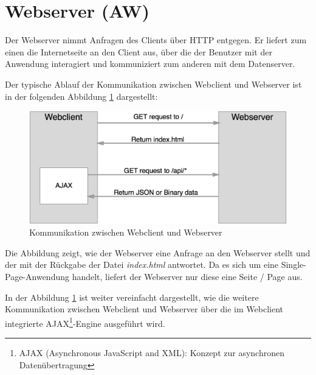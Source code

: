 \clearpage
\section{Webserver (AW)}
\label{section_webserver}
Der Webserver nimmt Anfragen des Clients über HTTP entgegen. Er liefert zum einen die 
Internetseite an den Client aus, über die der Benutzer mit der Anwendung interagiert und 
kommuniziert zum anderen mit dem Datenserver.

Der typische Ablauf der Kommunikation zwischen Webclient und Webserver ist in der 
folgenden Abbildung \ref{fig_webserver_webclient} dargestellt:

\begin{figure}[h]
	\centering
	\includegraphics[width=\textwidth]{bilder/abbildung_webserver_webclient}
	\caption{Kommunikation zwischen Webclient und Webserver}
	\label{fig_webserver_webclient}
\end{figure}

Die Abbildung zeigt, wie der Webserver eine Anfrage an 
den Webserver stellt und der mit der Rückgabe der Datei \textit{index.html} antwortet. Da es sich um eine Single-Page-Anwendung handelt, liefert der Webserver nur diese eine Seite / Page aus.

In der Abbildung \ref{fig_webserver_webclient} ist weiter vereinfacht dargestellt, wie die weitere Kommunikation zwischen Webclient und Webserver über die im Webclient integrierte AJAX\footnote{AJAX (Asynchronous JavaScript and XML): Konzept zur asynchronen Datenübertragung}-Engine ausgeführt wird.
\clearpage
